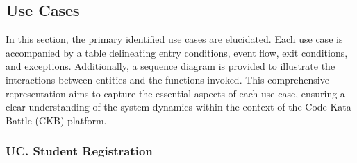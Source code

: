 \subsection{Use Cases}
\label{subsec: use_case}%
\setcounter{uc}{1}
\newcommand{\cuc}{\theuc\stepcounter{uc}}
In this section, the primary identified use cases are elucidated. 
Each use case is accompanied by a table delineating entry conditions, event flow, exit conditions, and exceptions. 
Additionally, a sequence diagram is provided to illustrate the interactions between entities and the functions invoked. 
This comprehensive representation aims to capture the essential aspects of each use case, ensuring a clear understanding of the system dynamics within the context of the Code Kata Battle (CKB) platform.
\subsubsection*{UC\cuc . Student Registration}
